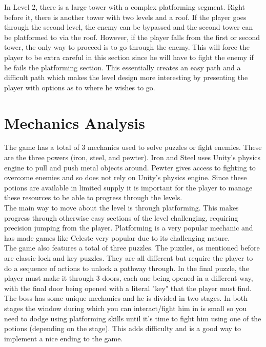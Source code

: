 \documentclass{article}
\begin{document}
In Level 2, there is a large tower with a complex platforming segment. Right before it, there is another tower with two levels and a roof. If the player goes through the second level, the enemy can be bypassed and the second tower can be platformed to via the roof. However, if the player falls from the first or second tower, the only way to proceed is to go through the enemy. This will force the player to be extra careful in this section since he will have to fight the enemy if he fails the platforming section. This essentially creates an easy path and a difficult path which makes the level design more interesting by presenting the player with options as to where he wishes to go.

\section{Mechanics Analysis}
The game has a total of 3 mechanics used to solve puzzles or fight enemies. These are the three powers (iron, steel, and pewter). Iron and Steel uses Unity's physics engine to pull and push metal objects around. Pewter gives access to fighting to overcome enemies and so does not rely on Unity's physics engine. Since these potions are available in limited supply it is important for the player to manage these resources to be able to progress through the levels.\\

The main way to move about the level is through platforming. This makes progress through otherwise easy sections of the level challenging, requiring precision jumping from the player. Platforming is a very popular mechanic and has made games like Celeste very popular due to its challenging nature.\\

The game also features a total of three puzzles. The puzzles, as mentioned before are classic lock and key puzzles. They are all different but require the player to do a sequence of actions to unlock a pathway through. In the final puzzle, the player must make it through 3 doors, each one being opened in a different way, with the final door being opened with a literal "key" that the player must find.\\

The boss has some unique mechanics and he is divided in two stages. In both stages the window during which you can interact/fight him in is small so you need to dodge using platforming skills until it's time to fight him using one of the potions (depending on the stage). This adds difficulty and is a good way to implement a nice ending to the game.
\end{document}
